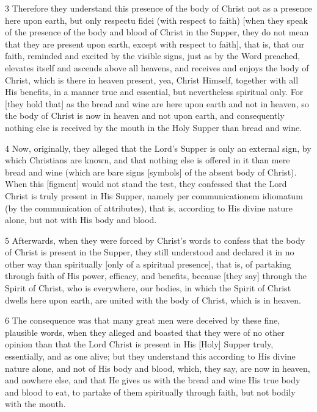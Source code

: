 3 Therefore they understand this presence of the body of Christ not as a presence here upon earth, but only respectu fidei (with respect to faith) [when they speak of the presence of the body and blood of Christ in the Supper, they do not mean that they are present upon earth, except with respect to faith], that is, that our faith, reminded and excited by the visible signs, just as by the Word preached, elevates itself and ascends above all heavens, and receives and enjoys the body of Christ, which is there in heaven present, yea, Christ Himself, together with all His benefits, in a manner true and essential, but nevertheless spiritual only. For [they hold that] as the bread and wine are here upon earth and not in heaven, so the body of Christ is now in heaven and not upon earth, and consequently nothing else is received by the mouth in the Holy Supper than bread and wine.

4 Now, originally, they alleged that the Lord’s Supper is only an external sign, by which Christians are known, and that nothing else is offered in it than mere bread and wine (which are bare signs [symbols] of the absent body of Christ). When this [figment] would not stand the test, they confessed that the Lord Christ is truly present in His Supper, namely per communicationem idiomatum (by the communication of attributes), that is, according to His divine nature alone, but not with His body and blood.

5 Afterwards, when they were forced by Christ’s words to confess that the body of Christ is present in the Supper, they still understood and declared it in no other way than spiritually [only of a spiritual presence], that is, of partaking through faith of His power, efficacy, and benefits, because [they say] through the Spirit of Christ, who is everywhere, our bodies, in which the Spirit of Christ dwells here upon earth, are united with the body of Christ, which is in heaven.

6 The consequence was that many great men were deceived by these fine, plausible words, when they alleged and boasted that they were of no other opinion than that the Lord Christ is present in His [Holy] Supper truly, essentially, and as one alive; but they understand this according to His divine nature alone, and not of His body and blood, which, they say, are now in heaven, and nowhere else, and that He gives us with the bread and wine His true body and blood to eat, to partake of them spiritually through faith, but not bodily with the mouth.

